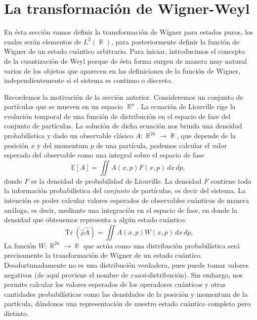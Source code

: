 \documentclass[a4paper]{report}
\DeclareMathOperator{\R}{\mathbb{R}}
\DeclareMathOperator{\Tr}{Tr}
\begin{document}

  \section{La transformación de Wigner-Weyl}

  En ésta sección vamos definir la transformación de Wigner
  para estados puros, los cuales serán elementos de
  $L^2(\R)$, para posteriormente definir la función de
  Wigner de un estado cuántico arbitrario. Para iniciar,
  introducimos el concepto de la cuantización de Weyl porque
  de ésta forma surgen de manera muy natural varios de los
  objetos que aparecen en las definiciones de la función de
  Wigner, independientemente si el sistema es continuo o
  discreto.

  Recordemos la motivación de la sección anterior.
  Consideremos un conjunto de partículas que se mueven en un
  espacio $\R^{n}$. La ecuación de Liouville rige la
  evolución temporal de una función de distribución en el
  espacio de fase del conjunto de partículas. La solución de
  dicha ecuación nos brinda una densidad probabilística y
  dado un observable clásico $A : \R^{2n} \to \R$, que
  depende de la posición $x$ y del momentum $p$ de una
  partícula, podemos calcular el valor esperado del
  observable como una integral sobre el espacio de fase
  \begin{equation}
    \mathbb E[A]
    = \iint A(x,p) F(x,p) \, dx \, dp,
  \end{equation}
  donde $F$ es la densidad de probabilidad de Liouville. La
  densidad $F$ contiene toda la información probabilística
  del \textit{conjunto} de partículas, es decir del sistema.
  La intención es poder calcular valores esperados de
  observables cuánticos de manera análoga, es decir,
  mediante una integración en el espacio de fase, en donde
  la densidad que obtenemos representa a algún estado
  cuántico:
  \begin{equation}
    \Tr\left(\hat{\rho} \hat{A}\right)
    = \iint A(x,p)W(x,p) \, dx \, dp,
  \end{equation}
  La función $W : \R^{2n} \to \R$ que actúa como una
  distribución probabilística será precisamente la
  transformación de Wigner de un estado cuántico.
  Desafortunadamente no es una distribución verdadera, pues
  puede tomar valores negativos (de aquí proviene el nombre
  de \textit{cuasi}-distribución). Sin embargo, nos permite
  calcular los valores esperados de los operadores cuánticos
  y otras cantidades probabilísticas como las densidades de
  la posición y momentum de la partícula, dándonos una
  representación de nuestro estado cuántico completo pero
  distinto.
\end{document}
